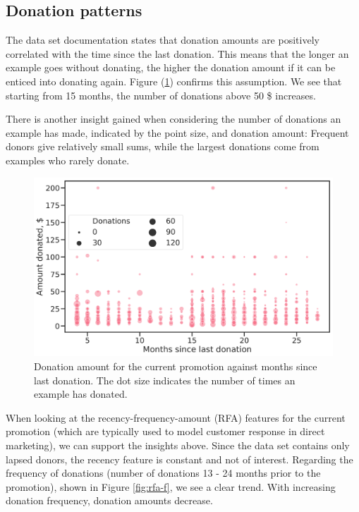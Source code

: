 \documentclass[
  11pt,
  a4paper,
  DIV=12,captions=tableheading,oneside,titlepage=firstiscover,abstracton]{scrreprt}
\begin{document}
\hypertarget{donation-patterns}{%
\subsection{Donation patterns}\label{donation-patterns}}

The data set documentation states that donation amounts are positively correlated with the time since the last donation. This means that the longer an example goes without donating, the higher the donation amount if it can be enticed into donating again. Figure (\ref{fig:donations-vs-time}) confirms this assumption. We see that starting from 15 months, the number of donations above 50 \$ increases.

There is another insight gained when considering the number of donations an example has made, indicated by the point size, and donation amount: Frequent donors give relatively small sums, while the largest donations come from examples who rarely donate.



\begin{figure}

{\centering \includegraphics[width=0.6\linewidth]{figures/eda/donations-vs-time-since-last-size-nbr-donations} 

}

\caption{Donation amount for the current promotion against months since last donation. The dot size indicates the number of times an example has donated.}\label{fig:donations-vs-time}
\end{figure}

When looking at the recency-frequency-amount (RFA) features for the current promotion (which are typically used to model customer response in direct marketing), we can support the insights above. Since the data set contains only lapsed donors, the recency feature is constant and not of interest. Regarding the frequency of donations (number of donations 13 - 24 months prior to the promotion), shown in Figure \ref{fig:rfa-f}, we see a clear trend. With increasing donation frequency, donation amounts decrease.
\end{document}
